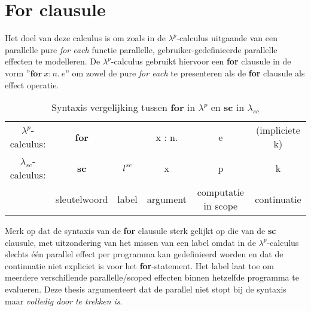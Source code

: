 \section{For clausule}
\label{sec:SyntaxFor}
Het doel van deze calculus is om zoals in de $\lambda^p$-calculus uitgaande van een parallelle pure \emph{for each} functie parallelle, gebruiker-gedefinieerde parallelle effecten te modelleren\cite{Xie2021}. De $\lambda^p$-calculus gebruikt hiervoor een \textbf{for} clausule in de vorm ''$\textbf{for} \ x : n. \ e$'' om zowel de pure \emph{for each} te presenteren als de \textbf{for} clausule als effect operatie.
\begin{table}[h]
    \centering
    \begin{tabular}{c c c c c c}
        $\lambda^p$-calculus: & \textbf{for} &  & x : n. & e &  (impliciete k) \\
        $\lambda_{sc}$-calculus: & \textbf{sc} & $l^{sc}$ & x & p & k \\  
        & sleutelwoord & label & argument & computatie in scope & continuatie \\
    \end{tabular}
    \caption{Syntaxis vergelijking tussen \textbf{for} in $\lambda^p$ en \textbf{sc} in $\lambda_{sc}$}
    \label{tab:synForSc}
\end{table}
Merk op dat de syntaxis van de \textbf{for} clausule sterk gelijkt op die van de \textbf{sc} clausule, met uitzondering van het missen van een label omdat in de $\lambda^p$-calculus slechts \'e\'en parallel effect per programma kan gedefinieerd worden en dat de continuatie niet expliciet is voor het \textbf{for}-statement.
Het label laat toe om meerdere verschillende parallelle/scoped effecten binnen hetzelfde programma te evalueren. \newline 
Deze thesis argumenteert dat de parallel niet stopt bij de syntaxis maar \emph{volledig door te trekken is}.

